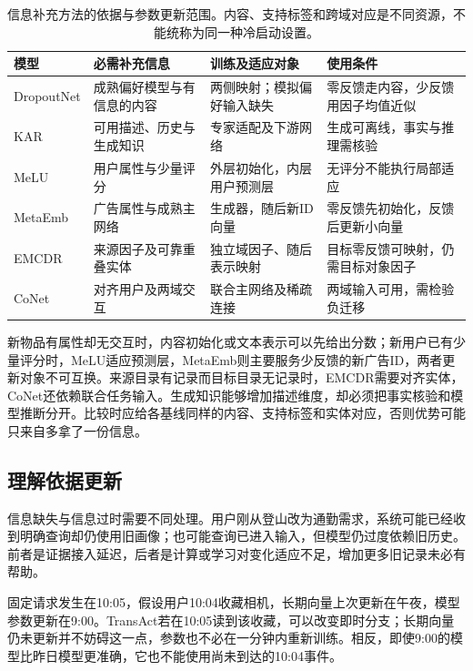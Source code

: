 \begin{table}[htbp]
  \centering
  \small
  \begin{tabularx}{\linewidth}{@{}lXXX@{}}
    \toprule
    模型 & 必需补充信息 & 训练及适应对象 & 使用条件 \\
    \midrule
    DropoutNet & 成熟偏好模型与有信息的内容 & 两侧映射；模拟偏好输入缺失 & 零反馈走内容，少反馈用因子均值近似 \\
    KAR & 可用描述、历史与生成知识 & 专家适配及下游网络 & 生成可离线，事实与推理需核验 \\
    MeLU & 用户属性与少量评分 & 外层初始化，内层用户预测层 & 无评分不能执行局部适应 \\
    MetaEmb & 广告属性与成熟主网络 & 生成器，随后新ID向量 & 零反馈先初始化，反馈后更新小向量 \\
    EMCDR & 来源因子及可靠重叠实体 & 独立域因子、随后表示映射 & 目标零反馈可映射，仍需目标对象因子 \\
    CoNet & 对齐用户及两域交互 & 联合主网络及稀疏连接 & 两域输入可用，需检验负迁移 \\
    \bottomrule
  \end{tabularx}
  \caption{信息补充方法的依据与参数更新范围。内容、支持标签和跨域对应是不同资源，不能统称为同一种冷启动设置。}
  \label{tab:rs-information-completion}
\end{table}

新物品有属性却无交互时，内容初始化或文本表示可以先给出分数；新用户已有少量评分时，MeLU适应预测层，MetaEmb则主要服务少反馈的新广告ID，两者更新对象不可互换。来源目录有记录而目标目录无记录时，EMCDR需要对齐实体，CoNet还依赖联合任务输入。生成知识能够增加描述维度，却必须把事实核验和模型推断分开。比较时应给各基线同样的内容、支持标签和实体对应，否则优势可能只来自多拿了一份信息。

\subsection{理解依据更新}
\label{sec:rs-evidence-refresh}

信息缺失与信息过时需要不同处理。用户刚从登山改为通勤需求，系统可能已经收到明确查询却仍使用旧画像；也可能查询已进入输入，但模型仍过度依赖旧历史。前者是证据接入延迟，后者是计算或学习对变化适应不足，增加更多旧记录未必有帮助。

固定请求发生在10:05，假设用户10:04收藏相机，长期向量上次更新在午夜，模型参数更新在9:00。TransAct若在10:05读到该收藏，可以改变即时分支；长期向量仍未更新并不妨碍这一点，参数也不必在一分钟内重新训练。相反，即使9:00的模型比昨日模型更准确，它也不能使用尚未到达的10:04事件。


